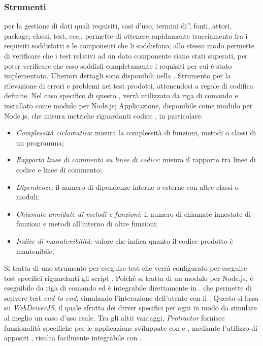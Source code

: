 \subsubsection{Strumenti}
\subsubsubsubsection{\pragmadb}
 per la gestione di dati quali requisiti, casi d'uso, termini di \G, fonti, attori, package, classi, test, ecc., permette di ottenere rapidamente tracciamento fra i requisiti soddisfatti e le componenti che li soddisfano; allo stesso modo permette di verificare che i test relativi ad un dato componente siano stati superati, per poter verificare che esso soddisfi completamente i requisiti per cui è stato implementato.
Ulteriori dettagli sono disponibili nella .
Strumento per la rilevazione di errori e problemi nei test  prodotti, attenendosi a regole di codifica definite.
Nel caso specifico di questo , \textbf{} verrà utilizzato da riga di comando e installato come modulo per Node.js;
Applicazione, disponibile come modulo per Node.js, che misura metriche riguardanti codice , in particolare:
\begin{itemize}
\item \textit{Complessità ciclomatica}: misura la complessità di funzioni, metodi o classi di un programma;
\item \textit{Rapporto linee di commento su linee di codice}: misura il rapporto tra linee di codice e linee di commento;
\item \textit{Dipendenze}: il numero di dipendenze interne o esterne con altre classi o moduli;
\item \textit{Chiamate annidate di metodi e funzioni}: il numero di chiamate innestate di funzioni e metodi all'interno di altre funzioni;
\item \textit{Indice di manutenibilità}: valore che indica quanto il codice prodotto è mantenibile.
\end{itemize}
Si tratta di uno strumento per eseguire test che verrà configurato per eseguire test specifici riguardanti gli script . Poiché si tratta di un modulo per Node.js, è eseguibile da riga di comando ed è integrabile direttamente in \textbf{}.
  che permette di scrivere test \textit{end-to-end}, simulando l'interazione dell'utente con il . Questo  si basa su \textit{WebDriverJS}, il quale sfrutta dei driver specifici per ogni  in modo da simulare al meglio un caso d’uso reale.
Tra gli altri vantaggi, \textit{Protractor} fornisce funzionalità specifiche per le applicazione sviluppate con \textit{} e , mediante l’utilizzo di appositi , risulta facilmente integrabile con \textit{}.
